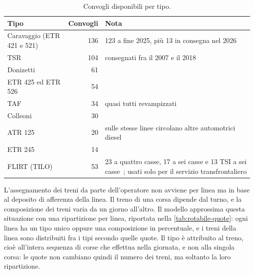 \begin{table}[H]
	\centering
	\caption{Convogli disponibili per tipo.}
	\label{tab:rotabile-flotta}
	\begin{tabularx}{\textwidth}{lrX}
		\toprule
		Tipo & Convogli & Nota \\
		\midrule
		Caravaggio (ETR 421 e 521) & 136 & 123 a fine 2025, più 13 in consegna nel 2026 \\
		TSR & 104 & consegnati fra il 2007 e il 2018\\
		Donizetti & 61 & \\
		ETR 425 ed ETR 526 & 54 & \\
		TAF & 34 & quasi tutti revampizzati\\
		Colleoni & 30 & \\
		ATR 125 & 20 & sulle stesse linee circolano altre automotrici diesel\\
		ETR 245 & 14 &  \\
		FLIRT (TILO) & 53 & 23 a quattro casse, 17 a sei casse e 13 TSI a sei casse~\cite{tilo_datifatti}; usati solo per il servizio transfrontaliero \\
		\bottomrule
	\end{tabularx}
\end{table}
L'assegnamento dei treni da parte dell'operatore non avviene per linea ma in base al deposito di afferenza della linea. Il treno di una corsa dipende dal turno, e la composizione dei treni varia da un giorno all'altro. Il modello approssima questa situazione con una ripartizione per linea, riportata nella \cref{tab:rotabile-quote}: ogni linea ha un tipo unico oppure una composizione in percentuale, e i treni della linea sono distribuiti fra i tipi secondo quelle quote. Il tipo è attribuito al treno, cioè all'intera sequenza di corse che effettua nella giornata, e non alla singola corsa: le quote non cambiano quindi il numero dei treni, ma soltanto la loro ripartizione.

